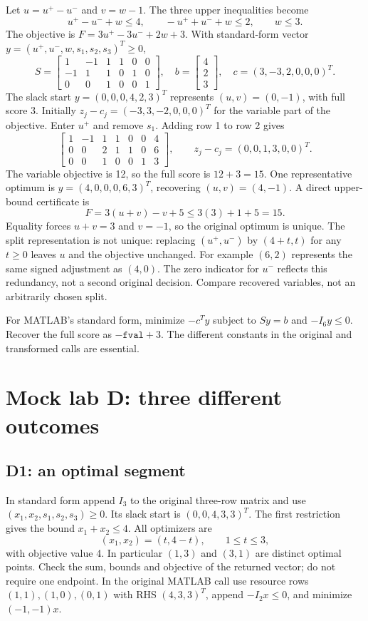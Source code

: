\documentclass[11pt,a4paper]{article}
\begin{document}
Let $u=u^+-u^-$ and $v=w-1$. The three upper inequalities become
\[
  u^+-u^-+w\leq4,\qquad -u^++u^-+w\leq2,\qquad w\leq3.
\]
The objective is $F=3u^+-3u^-+2w+3$. With standard-form vector
$y=(u^+,u^-,w,s_1,s_2,s_3)^T\geq0$,
\[
  S=\begin{bmatrix}
    1&-1&1&1&0&0\\-1&1&1&0&1&0\\0&0&1&0&0&1
  \end{bmatrix},\quad
  b=\begin{bmatrix}4\\2\\3\end{bmatrix},\quad c=(3,-3,2,0,0,0)^T.
\]
The slack start $y=(0,0,0,4,2,3)^T$ represents $(u,v)=(0,-1)$,
with full score 3. Initially $z_j-c_j=(-3,3,-2,0,0,0)^T$ for the
variable part of the objective. Enter $u^+$ and remove $s_1$. Adding row 1
to row 2 gives
\[
  \left[\begin{array}{rrrrrr|r}
      1&-1&1&1&0&0&4\\0&0&2&1&1&0&6\\0&0&1&0&0&1&3
    \end{array}\right],\qquad z_j-c_j=(0,0,1,3,0,0)^T.
\]
The variable objective is 12, so the full score is $12+3=15$. One
representative optimum is $y=(4,0,0,0,6,3)^T$, recovering
$(u,v)=(4,-1)$. A direct upper-bound certificate is
\[
  F=3(u+v)-v+5\leq3(3)+1+5=15.
\]
Equality forces $u+v=3$ and $v=-1$, so the original optimum is unique.
The split representation is not unique: replacing $(u^+,u^-)$ by
$(4+t,t)$ for any $t\geq0$ leaves $u$ and the objective unchanged.
For example $(6,2)$ represents the same signed adjustment as $(4,0)$.
The zero indicator for $u^-$ reflects this redundancy, not a second original
decision. Compare recovered variables, not an arbitrarily chosen split.

For MATLAB's standard form, minimize $-c^Ty$ subject to $Sy=b$ and
$-I_6y\leq0$. Recover the full score as $-\texttt{fval}+3$.
The different constants in the original and transformed calls are essential.

\clearpage
\section{Mock lab D: three different outcomes}
\subsection{D1: an optimal segment}
In standard form append $I_3$ to the original three-row matrix and use
$(x_1,x_2,s_1,s_2,s_3)\geq0$. Its slack start is $(0,0,4,3,3)^T$.
The first restriction gives the bound $x_1+x_2\leq4$. All optimizers are
\[
  (x_1,x_2)=(t,4-t),\qquad1\leq t\leq3,
\]
with objective value 4. In particular $(1,3)$ and $(3,1)$ are distinct
optimal points. Check the sum, bounds and objective of the returned vector;
do not require one endpoint. In the original MATLAB call use resource rows
$(1,1),(1,0),(0,1)$ with RHS $(4,3,3)^T$, append $-I_2x\leq0$, and
minimize $(-1,-1)x$.
\end{document}
